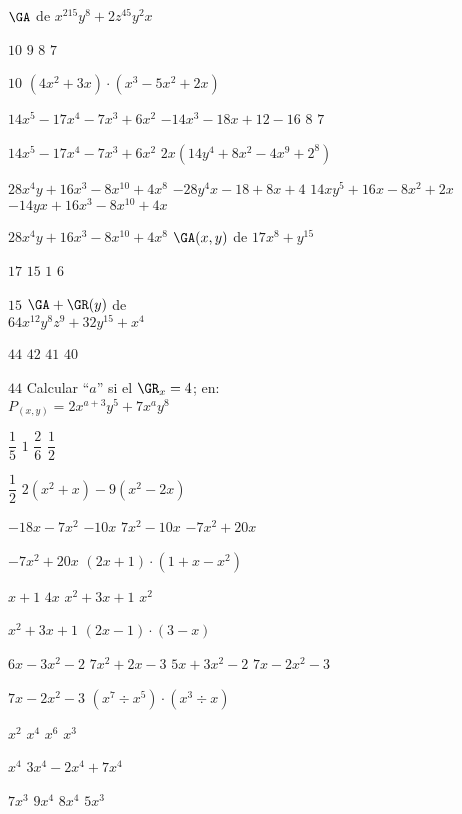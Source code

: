 $\GA$ de $x^215y^8+2z^45y^2x$
\begin{enum}
	\ii $10$
	\ii $9$
	\ii $8$
	\ii $7$
\end{enum}
$10$
$\left(4x^2+3x\right)\cdot\left(x^3-5x^2+2x\right)$
\begin{enum}
	\ii $14x^5-17x^4-7x^3+6x^2$
	\ii $-14x^3-18x+12-16$
	\ii $8$
	\ii $7$
\end{enum}
$14x^5-17x^4-7x^3+6x^2$
$2x\left(14y^4+8x^2-4x^9+2^8\right)$
\begin{enum}
	\ii $28x^4y+16x^3-8x^{10}+4x^8$
	\ii $-28y^4x-18+8x+4$
	\ii $14xy^5+16x-8x^2+2x$
	\ii $-14yx+16x^3-8x^{10}+4x$
\end{enum}
$28x^4y+16x^3-8x^{10}+4x^8$
$\GA(x,y)$ de $17x^8+y^{15}$
\begin{enum}
	\ii $17$
	\ii $15$
	\ii $1$
	\ii $6$
\end{enum}
$15$
$\GA+\GR(y)$ de \\
$64x^{12}y^8z^9+32y^{15}+x^4$
\begin{enum}
	\ii $44$
	\ii $42$
	\ii $41$
	\ii $40$
\end{enum}
$44$
Calcular ``$a$'' si el $\GR_x=4$; en: \\
$P_{(x,y)}=2x^{a+3}y^5+7x^ay^8$
\begin{enum}
	\ii $\dfrac{1}{5}$
	\ii $1$
	\ii $\dfrac{2}{6}$
	\ii $\dfrac{1}{2}$
\end{enum}
$\dfrac{1}{2}$
$2\left(x^2+x\right)-9\left(x^2-2x\right)$
\begin{enum}
	\ii $-18x-7x^2$
	\ii $-10x$
	\ii $7x^2-10x$
	\ii $-7x^2+20x$
\end{enum}
$-7x^2+20x$
$(2x+1)\cdot\left(1+x-x^2\right)$
\begin{enum}
	\ii $x+1$
	\ii $4x$
	\ii $x^2+3x+1$
	\ii $x^2$
\end{enum}
$x^2+3x+1$
$(2x-1)\cdot(3-x)$
\begin{enum}
	\ii $6x-3x^2-2$
	\ii $7x^2+2x-3$
	\ii $5x+3x^2-2$
	\ii $7x-2x^2-3$
\end{enum}
$7x-2x^2-3$
$\left(x^7\div x^5\right)\cdot\left(x^3\div x\right)$
\begin{enum}
	\ii $x^2$
	\ii $x^4$
	\ii $x^6$
	\ii $x^3$
\end{enum}
$x^4$
$3x^4-2x^4+7x^4$
\begin{enum}
	\ii $7x^3$
	\ii $9x^4$
	\ii $8x^4$
	\ii $5x^3$
\end{enum}
